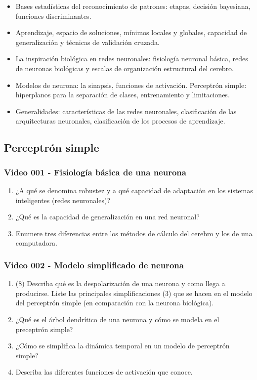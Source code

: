 \documentclass[a4paper,10pt,spanish,oneside]{article}
\begin{document}
\begin{itemize}
\item Bases estadísticas del reconocimiento de patrones: etapas, decisión bayesiana, funciones discriminantes.
\item Aprendizaje, espacio de soluciones, mínimos locales y globales, capacidad de generalización y técnicas de validación cruzada.
\item La inspiración biológica en redes neuronales: fisiología neuronal básica, redes de neuronas biológicas y escalas de organización estructural del cerebro.
\item Modelos de neurona: la sinapsis, funciones de activación. Perceptrón simple: hiperplanos para la separación de clases, entrenamiento y limitaciones.
\item Generalidades: características de las redes neuronales, clasificación de las arquitecturas neuronales, clasificación de los procesos de aprendizaje.
\end{itemize}

\subsection{Perceptrón simple}

\subsubsection{Video 001 - Fisiología básica de una neurona}

\begin{enumerate}
\item ¿A qué se denomina robustez y a qué capacidad de adaptación en los sistemas inteligentes (redes neuronales)?

\item ¿Qué es la capacidad de generalización en una red neuronal?

\item Enumere tres diferencias entre los métodos de cálculo del cerebro y los de una computadora.
\end{enumerate}

\subsubsection{Video 002 - Modelo simplificado de neurona}

\begin{enumerate}
\item (8) Describa qué es la despolarización de una neurona y como llega a producirse. Liste las principales simplificaciones (3) que se hacen en el modelo del perceptrón simple (en comparación con la neurona biológica).

\item ¿Qué es el árbol dendrítico de una neurona y cómo se modela en el preceptrón simple?

\item ¿Cómo se simplifica la dinámica temporal en un modelo de perceptrón simple?

\item Describa las diferentes funciones de activación que conoce.
\end{enumerate}
\end{document}
